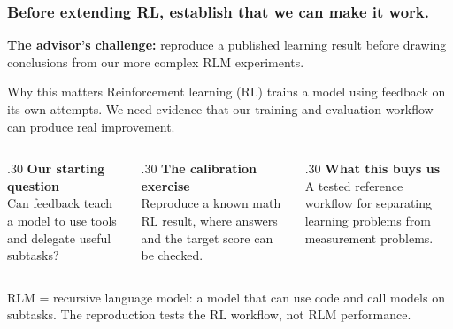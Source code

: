 \documentclass[aspectratio=169,11pt]{beamer}
\newcommand{\source}[1]{\vfill{\scriptsize\color{Gray}#1\par}}
\begin{document}
\begin{frame}[t]
\frametitle{Before extending RL, establish that we can make it work.}
\textbf{The advisor's challenge:} reproduce a published learning result before
drawing conclusions from our more complex RLM experiments.
\medskip
\begin{block}{Why this matters}
Reinforcement learning (RL) trains a model using feedback on its own attempts.
We need evidence that our training and evaluation workflow can produce real improvement.
\end{block}
\medskip
\begin{columns}[T,onlytextwidth]
\begin{column}{.30\textwidth}
\textbf{Our starting question}\\[2mm]
Can feedback teach a model to use tools and delegate useful subtasks?
\end{column}
\begin{column}{.30\textwidth}
\textbf{The calibration exercise}\\[2mm]
Reproduce a known math RL result, where answers and the target score can be checked.
\end{column}
\begin{column}{.30\textwidth}
\textbf{What this buys us}\\[2mm]
A tested reference workflow for separating learning problems from measurement problems.
\end{column}
\end{columns}
\source{RLM = recursive language model: a model that can use code and call models on subtasks. The reproduction tests the RL workflow, not RLM performance.}
\end{frame}
\end{document}

